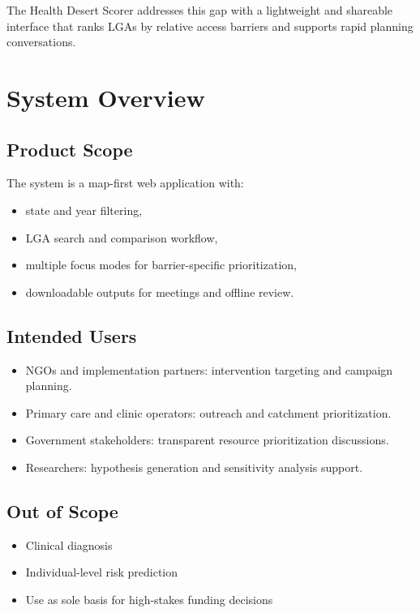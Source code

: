 \documentclass[11pt]{article}
\begin{document}
The Health Desert Scorer addresses this gap with a lightweight and shareable interface that ranks LGAs by relative access barriers and supports rapid planning conversations.

\section{System Overview}
\subsection{Product Scope}
The system is a map-first web application with:
\begin{itemize}[leftmargin=1.5em]
  \item state and year filtering,
  \item LGA search and comparison workflow,
  \item multiple focus modes for barrier-specific prioritization,
  \item downloadable outputs for meetings and offline review.
\end{itemize}

\subsection{Intended Users}
\begin{itemize}[leftmargin=1.5em]
  \item NGOs and implementation partners: intervention targeting and campaign planning.
  \item Primary care and clinic operators: outreach and catchment prioritization.
  \item Government stakeholders: transparent resource prioritization discussions.
  \item Researchers: hypothesis generation and sensitivity analysis support.
\end{itemize}

\subsection{Out of Scope}
\begin{itemize}[leftmargin=1.5em]
  \item Clinical diagnosis
  \item Individual-level risk prediction
  \item Use as sole basis for high-stakes funding decisions
\end{itemize}
\end{document}
